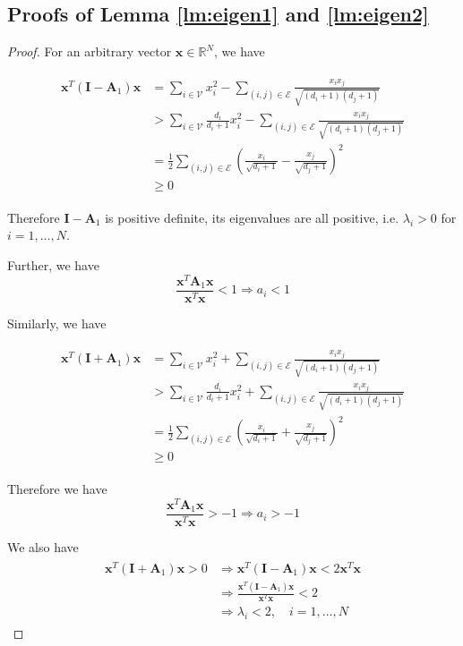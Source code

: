 \documentclass[lettersize,journal]{IEEEtran}
\theoremstyle{plain}
\theoremstyle{definition}
\theoremstyle{remark}
\begin{document}
\subsection{Proofs of Lemma \ref{lm:eigen1} and \ref{lm:eigen2}}
\begin{proof}
	For an arbitrary vector $\bm{x} \in \mathbb{R}^N$, we have
	
	\begin{align}
		\begin{split}
			\bm{x}^{T}\left(\bm{I}-\bm{A}_1\right)\bm{x} &= \sum_{i \in \mathcal{V}} x_i^2 - \sum_{(i,j)\in \mathcal{E}}\frac{x_i x_j}{\sqrt{(d_i+1)(d_j +1)}} \\
			&> \sum_{i \in \mathcal{V}} \frac{d_i}{d_i+1}x_i^2 - \sum_{(i,j)\in \mathcal{E}}\frac{x_i x_j}{\sqrt{(d_i+1)(d_j +1)}}\\
			&=\frac{1}{2}\sum_{(i,j)\in \mathcal{E}} \left(\frac{x_i}{\sqrt{d_i + 1}} - \frac{x_j}{\sqrt{d_j + 1}} \right)^2\\
			&\geq 0
		\end{split}
	\end{align}
	
	Therefore $\bm{I} - \bm{A}_1$ is positive definite, its eigenvalues are all positive, i.e. $\lambda_i > 0$ for $i=1,\ldots, N$.
	
	Further, we have
	\begin{equation}
		\frac{\bm{x}^{T} \bm{A}_1 \bm{x}}{\bm{x}^{T} \bm{x}} < 1 \Rightarrow a_i <1
	\end{equation}
	
	Similarly, we have
	
	\begin{align}
		\begin{split}
			\bm{x}^{T}\left(\bm{I}+\bm{A}_1\right)\bm{x} &= \sum_{i \in \mathcal{V}} x_i^2 + \sum_{(i,j)\in \mathcal{E}}\frac{x_i x_j}{\sqrt{(d_i+1)(d_j +1)}} \\
			&> \sum_{i \in \mathcal{V}} \frac{d_i}{d_i+1}x_i^2 + \sum_{(i,j)\in \mathcal{E}}\frac{x_i x_j}{\sqrt{(d_i+1)(d_j +1)}}\\
			&=\frac{1}{2}\sum_{(i,j)\in \mathcal{E}} \left(\frac{x_i}{\sqrt{d_i + 1}} + \frac{x_j}{\sqrt{d_j + 1}} \right)^2\\
			&\geq 0
		\end{split}
	\end{align}

Therefore we have 
\begin{equation}
	\frac{\bm{x}^{T} \bm{A}_1 \bm{x}}{\bm{x}^{T} \bm{x}} > -1 \Rightarrow a_i > -1
\end{equation}

We also have
\begin{align}
	\begin{split}
		\bm{x}^{T}\left(\bm{I}+\bm{A}_1\right)\bm{x} > 0 &\Rightarrow \bm{x}^{T}\left(\bm{I}-\bm{A}_1\right)\bm{x} < 2\bm{x}^{T}\bm{x} \\
		&\Rightarrow \frac{\bm{x}^{T}\left(\bm{I}-\bm{A}_1\right)\bm{x}}{\bm{x}^{T}\bm{x}} < 2\\
		& \Rightarrow \lambda_i < 2, \quad i = 1, \ldots, N
	\end{split}
\end{align}
\end{proof}
\end{document}
